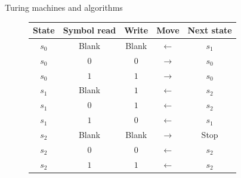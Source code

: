 \documentclass[11pt,compress,t,notes=noshow, xcolor=table]{beamer}
\begin{document}
\begin{vbframe}{Turing machines and algorithms}
\begin{figure}
	\begin{footnotesize}
	\begin{tabular}{|c|c|c|c|c|}
		\hline 
		\textbf{State} & \textbf{Symbol read} & \textbf{Write} & \textbf{Move} & \textbf{Next state} \\ 
		\hline 
		$s_0$ & Blank & Blank & $\leftarrow$ & $s_1$ \\ 
		$s_0$ & $0$ & $0$ & $\rightarrow$ & $s_0$ \\
		$s_0$ & $1$ & $1$ &  $\rightarrow$ & $s_0$ \\
		\hline 
		$s_1$ & Blank & $1$ & $\leftarrow$ & $s_2$ \\ 
		$s_1$ & $0$ & $1$ & $\leftarrow$ & $s_2$ \\
		$s_1$ & $1$ & $0$ &  $\leftarrow$ & $s_1$ \\
		\hline 
		$s_2$ & Blank & Blank & $\rightarrow$ & Stop \\ 
		$s_2$ & $0$ & $0$ & $\leftarrow$ & $s_2$ \\
		$s_2$ & $1$ & $1$ &  $\leftarrow$ & $s_2$ \\
		\hline 
	\end{tabular} 
	\end{footnotesize}
	
\end{figure}

\end{vbframe}





\end{document}
